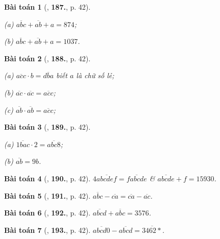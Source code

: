\documentclass{article}
\numberwithin{equation}{section}
\newtheorem{baitoan}{Bài toán}[section]
\begin{document}
\begin{baitoan}[\cite{Binh_Toan_6_tap_1}, \textbf{187.}, p. 42]
	\begin{enumerate*}
		\item[(a)] $\overline{abc} + \overline{ab} + a = 874$;
		\item[(b)] $\overline{abc} + \overline{ab} + a = 1037$.
	\end{enumerate*}
\end{baitoan}

\begin{baitoan}[\cite{Binh_Toan_6_tap_1}, \textbf{188.}, p. 42]
	\begin{enumerate*}
		\item[(a)] $\overline{acc}\cdot b = \overline{dba}$ biết $a$ là chữ số lẻ;
		\item[(b)] $\overline{ac}\cdot\overline{ac} = \overline{acc}$;
		\item[(c)] $\overline{ab}\cdot\overline{ab} = \overline{acc}$;
	\end{enumerate*}
\end{baitoan}

\begin{baitoan}[\cite{Binh_Toan_6_tap_1}, \textbf{189.}, p. 42]
	\begin{enumerate*}
		\item[(a)] $\overline{1bac}\cdot 2 = \overline{abc8}$;
		\item[(b)] $\overline{ab} = 9b$.
	\end{enumerate*}
\end{baitoan}

\begin{baitoan}[\cite{Binh_Toan_6_tap_1}, \textbf{190.}, p. 42]
	$4\overline{abcdef} = \overline{fabcde}$ \& $\overline{abcde} + f = 15930$.
\end{baitoan}

\begin{baitoan}[\cite{Binh_Toan_6_tap_1}, \textbf{191.}, p. 42]
	$\overline{abc} - \overline{ca} = \overline{ca} - \overline{ac}$.
\end{baitoan}

\begin{baitoan}[\cite{Binh_Toan_6_tap_1}, \textbf{192.}, p. 42]
	$\overline{abcd} + \overline{abc} = 3576$.
\end{baitoan}

\begin{baitoan}[\cite{Binh_Toan_6_tap_1}, \textbf{193.}, p. 42]
	$\overline{abcd0} - \overline{abcd} = \overline{3462*}$.
\end{baitoan}
\end{document}
